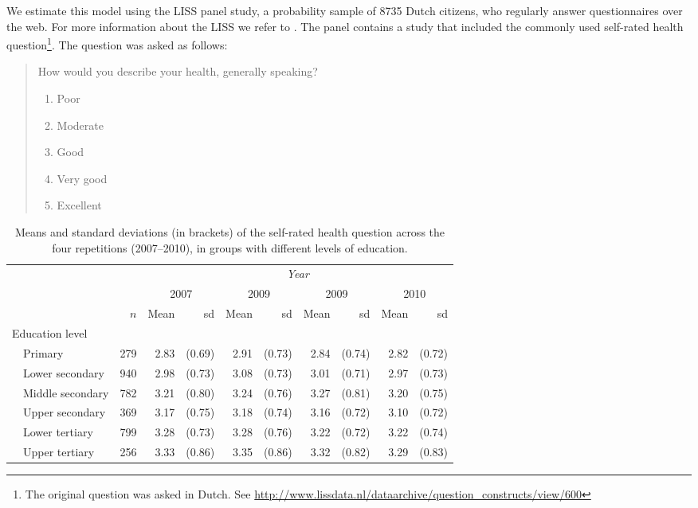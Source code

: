 \documentclass[a4paper,11pt]{article}
\newcommand{\0}{\boldsymbol{0}}
\begin{document}
We estimate this model using the LISS panel study, a probability sample 
of 8735 Dutch citizens, who regularly answer questionnaires over the web. 
For more information about the LISS we refer to \cite{scherpenzeel2011data}.
The  panel contains a study that included the commonly used self-rated health question\footnote{The original question was asked in Dutch. See \url{http://www.lissdata.nl/dataarchive/question_constructs/view/600}}. The question was asked as follows:
\begin{quote}
	How would you describe your health, generally speaking?
	
	\begin{enumerate}  \setlength{\itemsep}{0pt}  \setlength{\parskip}{0pt}
  \setlength{\parsep}{0pt}
		\item Poor
		\item Moderate
		\item Good
		\item Very good
		\item Excellent
	\end{enumerate}
\end{quote}


\begin{table}[bt]\begin{small}
\begin{center}
\begin{tabular}{llrrrrrrrrr}  \hline  \hline
&&&  \multicolumn{8}{c}{\emph{Year}}\\\cline{4-11}
&&& \multicolumn{2}{c}{2007} & \multicolumn{2}{c}{2009} & \multicolumn{2}{c}{2009} & \multicolumn{2}{c}{2010} \\
&&$n$&Mean&sd&Mean&sd&Mean&sd&Mean&sd\\
  \hline
  \multicolumn{2}{l}{Education level}\\
 
& Primary	  & 279 & 2.83 & (0.69) & 2.91 & (0.73) & 2.84 & (0.74) & 2.82 & (0.72) \\ 
& Lower secondary  & 940 & 2.98 & (0.73) & 3.08 & (0.73) & 3.01 & (0.71) & 2.97 & (0.73) \\ 
& Middle secondary & 782 & 3.21 & (0.80) & 3.24 & (0.76) & 3.27 & (0.81) & 3.20 & (0.75) \\ 
& Upper secondary  & 369 & 3.17 & (0.75) & 3.18 & (0.74) & 3.16 & (0.72) & 3.10 & (0.72) \\ 
& Lower tertiary	  & 799 & 3.28 & (0.73) & 3.28 & (0.76) & 3.22 & (0.72) & 3.22 & (0.74) \\ 
& Upper tertiary	  & 256 & 3.33 & (0.86) & 3.35 & (0.86) & 3.32 & (0.82) & 3.29 & (0.83) \\ 
   \hline
   \hline
\end{tabular}
\caption{Means and standard deviations (in brackets) of the self-rated health question across the four repetitions (2007--2010), in 
groups with different levels of education.}\label{tab:descriptives}
\end{center}\end{small}
\end{table}
\end{document}
